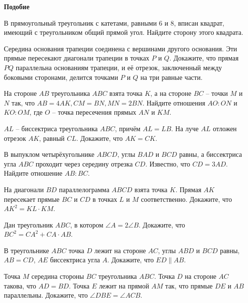 \documentclass{article}
\begin{document}
    \large

    \begin{center}
        \textbf{Подобие}
    \end{center}

    \begin{enumerate_boxed}

        \item В прямоугольный треугольник с катетами, равными 6 и 8, вписан квадрат, имеющий с треугольником общий прямой угол.
        Найдите сторону этого квадрата.


        \item Середина основания трапеции соединена с вершинами другого основания.
        Эти прямые пересекают диагонали трапеции в точках $P$ и $Q$.
        Докажите, что прямая $PQ$ параллельна основаниям трапеции, и её отрезок, заключенный между боковыми сторонами, делится точками $P$ и $Q$ на три равные части.

        \item На стороне $AB$ треугольника $ABC$ взята точка $K$, а на стороне $BC$ – точки $M$ и $N$ так, что $AB = 4AK, CM = BN, MN = 2BN$.
        Найдите отношения $AO:ON$ и $KO:OM$, где $O$ – точка пересечения прямых $AN$ и $KM$.

        \item $AL$ – биссектриса треугольника $ABC$, причём $AL=LB$.
        На луче $AL$ отложен отрезок $AK$, равный $CL$.
        Докажите, что $AK=CK$.

        \item В выпуклом четырёхугольнике $ABCD$, углы $BAD$ и $BCD$ равны, а биссектриса угла $ABC$ проходит через середину отрезка $CD$.
        Известно, что $CD = 3AD$.
        Найдите отношение $AB : BC$.

        \item На диагонали $BD$ параллелограмма $ABCD$ взята точка $K$.
        Прямая $AK$ пересекает прямые $BC$ и $CD$ в точках $L$ и $M$ соответственно.
        Докажите, что $AK^2 =KL \cdot KM$.

        \item Дан треугольник $ABC$, в котором $\angle A = 2\angle B$.
        Докажите, что $BC^2 = CA^2 + CA \cdot AB$.

        \item В треугольнике $ABC$ точка $D$ лежит на стороне $AC$, углы $ABD$ и $BCD$ равны, $AB = CD$, $AE$ биссектриса угла $A$.
        Докажите, что $ED \parallel AB$.

        \item Точка $M$ середина стороны $BC$ треугольника $ABC$.
        Точка $D$ на стороне $AC$ такова, что $AD = BD$.
        Точка $E$ лежит на прямой $AM$ так, что прямые $DE$ и $AB$ параллельны.
        Докажите, что $\angle DBE =  \angle ACB$.


\end{enumerate_boxed}
\end{document}

